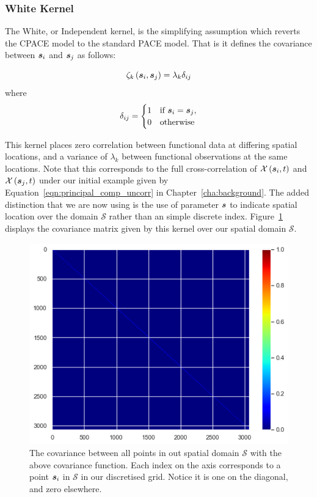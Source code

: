 \subsubsection{White Kernel \label{sssec:white_kern}}
The White, or Independent kernel, is the simplifying assumption which reverts the CPACE model to the standard PACE model. That is it defines the covariance between $\bm{{s}}_{i}$ and $\bm{{s}}_{j}$ as follows:

\begin{equation}
	\zeta_k\left(\bm{{s}}_{i}, \bm{{s}}_{j}\right) = \lambda_k\delta_{ij}
\end{equation}
where 
\begin{equation*}
\delta_{ij} = \begin{cases}
	1 & \text{if } \bm{{s}}_{i} = \bm{{s}}_{j}, \\
	0 & \text{otherwise}
\end{cases} 
\end{equation*}

This kernel places zero correlation between functional data at differing spatial locations, and a variance of $\lambda_k$ between functional observations at the same locations.
Note that this corresponds to the full cross-correlation of $\mathcal{X}\left(\bm{{s}}_{i}, t \right)$ and  $\mathcal{X}\left(\bm{{s}}_{j}, t \right)$ under our initial example given by Equation~\ref{eqn:principal_comp_uncorr} in Chapter~\ref{cha:background}.
The added distinction that we are now using  is the use of parameter $\bm{{s}}$ to indicate spatial location over the domain $\mathcal{S}$ rather than an simple discrete index.
Figure~\ref{fig:ex_white} displays the covariance matrix given by this kernel over our spatial domain $\mathcal{S}$. 

\begin{figure}
	\centering
	\includegraphics[width=\textwidth]{ex_white}
	\caption{The covariance between all points in out spatial domain $\mathcal{S}$ with the above covariance function. Each index on the axis corresponds to a point $\bm{{s}}_i$ in $\mathcal{S}$ in our discretised grid. Notice it is one on the diagonal, and zero elsewhere.}
	\label{fig:ex_white}
\end{figure}

